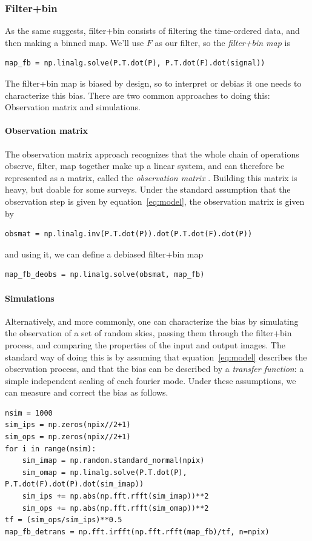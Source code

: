 \documentclass[twocolumn,apj]{aastex63}
\begin{document}
\subsubsection{Filter+bin}
As the same suggests, filter+bin consists of filtering the time-ordered
data, and then making a binned map. We'll use $F$ as our filter, so
the \emph{filter+bin map} is
\begin{lstlisting}
map_fb = np.linalg.solve(P.T.dot(P), P.T.dot(F).dot(signal))
\end{lstlisting}
The filter+bin map is biased by design, so to interpret or debias it one
needs to characterize this bias. There are two common approaches
to doing this: Observation matrix and simulations.

\paragraph{Observation matrix}
The observation matrix approach
recognizes that the whole chain of operations observe, filter, map
together make up a linear system, and can therefore be represented
as a matrix, called the \emph{observation matrix} \citep{bicep2-obsmat}.
Building this matrix is heavy, but doable for some
surveys. Under the standard assumption that the observation step is
given by equation~\ref{eq:model}, the observation matrix is given by
\begin{lstlisting}
obsmat = np.linalg.inv(P.T.dot(P)).dot(P.T.dot(F).dot(P))
\end{lstlisting}
and using it, we can define a debiased filter+bin map
\begin{lstlisting}
map_fb_deobs = np.linalg.solve(obsmat, map_fb)
\end{lstlisting}

\paragraph{Simulations}
Alternatively, and more commonly, one can characterize the bias
by simulating the observation of a set of random skies, passing
them through the filter+bin process, and comparing the properties
of the input and output images. The standard way of doing this is
by assuming that equation~\ref{eq:model} describes the observation
process, and that the bias can be described by a \emph{transfer function}:
a simple independent scaling of each fourier mode. Under
these assumptions, we can measure and correct the bias as follows.
\begin{lstlisting}
nsim = 1000
sim_ips = np.zeros(npix//2+1)
sim_ops = np.zeros(npix//2+1)
for i in range(nsim):
	sim_imap = np.random.standard_normal(npix)
	sim_omap = np.linalg.solve(P.T.dot(P), P.T.dot(F).dot(P).dot(sim_imap))
	sim_ips += np.abs(np.fft.rfft(sim_imap))**2
	sim_ops += np.abs(np.fft.rfft(sim_omap))**2
tf = (sim_ops/sim_ips)**0.5
map_fb_detrans = np.fft.irfft(np.fft.rfft(map_fb)/tf, n=npix)
\end{lstlisting}
\end{document}
